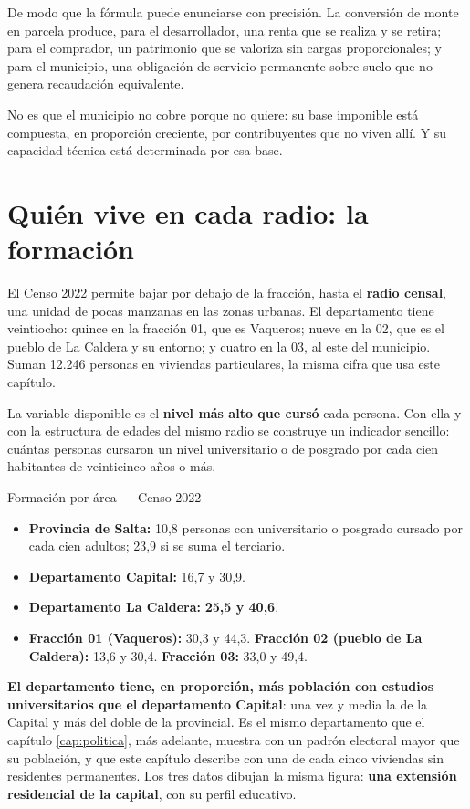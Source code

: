 De modo que la fórmula puede enunciarse con precisión. La conversión de monte en parcela produce, para el desarrollador, una renta que se realiza y se retira; para el comprador, un patrimonio que se valoriza sin cargas proporcionales; y para el municipio, una obligación de servicio permanente sobre suelo que no genera recaudación equivalente.

No es que el municipio no cobre porque no quiere: su base imponible está compuesta, en proporción creciente, por contribuyentes que no viven allí. Y su capacidad técnica está determinada por esa base.


\section{Quién vive en cada radio: la formación}

El Censo 2022 permite bajar por debajo de la fracción, hasta el \textbf{radio censal}, una unidad de pocas manzanas en las zonas urbanas. El departamento tiene veintiocho: quince en la fracción 01, que es Vaqueros; nueve en la 02, que es el pueblo de La Caldera y su entorno; y cuatro en la 03, al este del municipio. Suman 12.246 personas en viviendas particulares, la misma cifra que usa este capítulo.

La variable disponible es el \textbf{nivel más alto que cursó} cada persona. Con ella y con la estructura de edades del mismo radio se construye un indicador sencillo: cuántas personas cursaron un nivel universitario o de posgrado por cada cien habitantes de veinticinco años o más.

\begin{ficha}{Formación por área --- Censo 2022}
\begin{itemize}[leftmargin=*,nosep]
\item \textbf{Provincia de Salta:} 10,8 personas con universitario o posgrado cursado por cada cien adultos; 23,9 si se suma el terciario.
\item \textbf{Departamento Capital:} 16,7 y 30,9.
\item \textbf{Departamento La Caldera:} \textbf{25,5 y 40,6}.
\item \textbf{Fracción 01 (Vaqueros):} 30,3 y 44,3. \textbf{Fracción 02 (pueblo de La Caldera):} 13,6 y 30,4. \textbf{Fracción 03:} 33,0 y 49,4.
\end{itemize}
\end{ficha}

\textbf{El departamento tiene, en proporción, más población con estudios universitarios que el departamento Capital}: una vez y media la de la Capital y más del doble de la provincial. Es el mismo departamento que el capítulo \ref{cap:politica}, más adelante, muestra con un padrón electoral mayor que su población, y que este capítulo describe con una de cada cinco viviendas sin residentes permanentes. Los tres datos dibujan la misma figura: \textbf{una extensión residencial de la capital}, con su perfil educativo.

